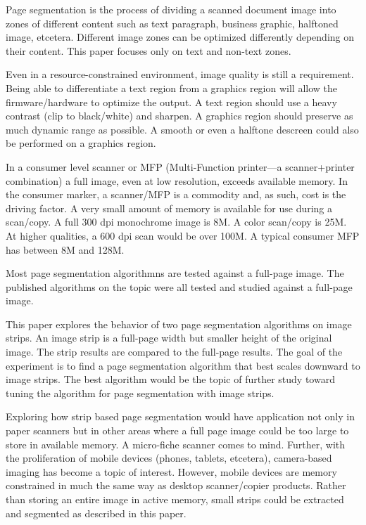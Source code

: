 \documentclass[conference]{IEEEtran}
\begin{document}
Page segmentation is the process of dividing a scanned document image into
zones of different content such as text paragraph, business graphic, halftoned
image, etcetera. Different image zones can be optimized differently depending
on their content. This paper focuses only on text and non-text zones. 

Even in a resource-constrained environment, image quality is still a
requirement. Being able to differentiate a text region from a graphics region
will allow the firmware/hardware to optimize the output. A text region should
use a heavy contrast (clip to black/white) and sharpen. A graphics region
should preserve as much dynamic range as possible. A smooth or even a halftone
descreen could also be performed on a graphics region.

In a consumer level scanner or MFP (Multi-Function printer—a scanner+printer
combination) a full image, even at low resolution, exceeds available
memory. In the consumer marker, a scanner/MFP is a commodity and, as such, cost
is the driving factor. A very small amount of memory is available for use
during a scan/copy. A full 300 dpi monochrome image is 8M. A color scan/copy is
25M. At higher qualities, a 600 dpi scan would be over 100M. A typical consumer
MFP has between 8M and 128M. 

Most page segmentation algorithmns are tested against a full-page image. The
published algorithms on the topic were all tested and studied against a full-page
image.

This paper explores the behavior of two page segmentation algorithms on image
strips.  An image strip is a full-page width but smaller height of the original
image. The strip results are compared to the full-page results. The goal of the
experiment is to find a page segmentation algorithm that best scales downward
to image strips. The best algorithm would be the topic of further study toward
tuning the algorithm for page segmentation with image strips.

Exploring how strip based page segmentation would have application not only in
paper scanners but in other areas where a full page image could be too large to
store in available memory. A micro-fiche scanner comes to mind. Further, with
the proliferation of mobile devices (phones, tablets, etcetera), camera-based
imaging has become a topic of interest.  However, mobile devices are memory
constrained in much the same way as desktop scanner/copier products. Rather
than storing an entire image in active memory, small strips could be extracted
and segmented as described in this paper.
\end{document}
